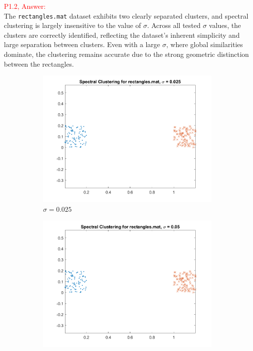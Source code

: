 \documentclass[11pt]{article}
\begin{document}
\textcolor{red}{P1.2, Answer:}\\

The \texttt{rectangles.mat} dataset exhibits two clearly separated clusters, and spectral clustering is largely insensitive to the value of \(\sigma\). Across all tested \(\sigma\) values, the clusters are correctly identified, reflecting the dataset's inherent simplicity and large separation between clusters. Even with a large \(\sigma\), where global similarities dominate, the clustering remains accurate due to the strong geometric distinction between the rectangles.

\begin{figure}[!ht]
    \centering
    \begin{subfigure}{0.45\textwidth}
        \includegraphics[width=\linewidth]{rectangles_sigma_0.025.png}
        \caption{\(\sigma = 0.025\)}
    \end{subfigure}
    \begin{subfigure}{0.45\textwidth}
        \includegraphics[width=\linewidth]{rectangles_sigma_0.050.png}

\end{subfigure}
\end{figure}
\end{document}
